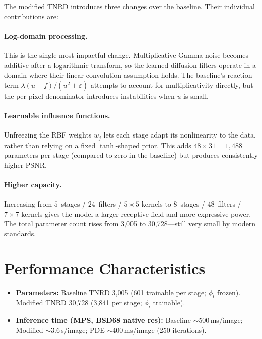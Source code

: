 \documentclass[10pt,conference]{IEEEtran}
\begin{document}
The modified TNRD introduces three changes over the baseline.  Their
individual contributions are:

\paragraph{Log-domain processing.}
This is the single most impactful change.  Multiplicative Gamma noise becomes
additive after a logarithmic transform, so the learned diffusion filters
operate in a domain where their linear convolution assumption holds.  The
baseline's reaction term $\lambda(u{-}f)/(u^2{+}\varepsilon)$ attempts to
account for multiplicativity directly, but the per-pixel denominator
introduces instabilities when $u$ is small.

\paragraph{Learnable influence functions.}
Unfreezing the RBF weights $w_j$ lets each stage adapt its nonlinearity to the
data, rather than relying on a fixed $\tanh$-shaped prior.  This adds $48
\times 31 = 1{,}488$ parameters per stage (compared to zero in the baseline)
but produces consistently higher PSNR.

\paragraph{Higher capacity.}
Increasing from $5$~stages / $24$~filters / $5{\times}5$ kernels to
$8$~stages / $48$~filters / $7{\times}7$ kernels gives the model a larger
receptive field and more expressive power.  The total parameter count rises
from 3{,}005 to 30{,}728---still very small by modern standards.

\section{Performance Characteristics}

\begin{itemize}
    \item \textbf{Parameters:} Baseline TNRD 3{,}005 (601 trainable per
          stage; $\phi_i$ frozen).  Modified TNRD 30{,}728 (3{,}841 per
          stage; $\phi_i$ trainable).
    \item \textbf{Inference time (MPS, BSD68 native res):} Baseline
          ${\sim}500$\,ms/image; Modified ${\sim}3.6$\,s/image; PDE
          ${\sim}400$\,ms/image (250 iterations).
\end{itemize}
\end{document}
